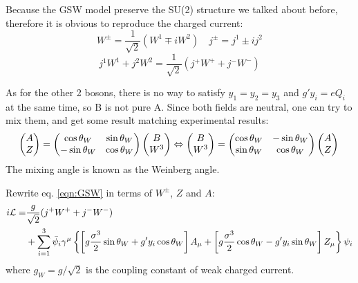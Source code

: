 Because the GSW model preserve the SU(2) structure we talked about before, 
therefore it is obvious to reproduce the charged current:
\begin{equation}
    W^\pm = \frac{1}{\sqrt{2}}(W^1 \mp iW^2)	\quad
    j^\pm = j^1 \pm ij^2
\end{equation}
\begin{equation}
    j^1W^1 + j^2W^2 = \frac{1}{\sqrt{2}}(j^+W^+ + j^-W^-)
\end{equation}

As for the other 2 bosons, there is no way to satisfy $y_1 = y_2 = y_3$ and 
$g'y_i = eQ_i$ at the same time, so B is not pure A. 
Since both fields are neutral, one can try to mix them, 
and get some result matching experimental results:
\begin{equation}
    \begin{pmatrix}
	A   \\
	Z   \\
    \end{pmatrix}
    =
    \begin{pmatrix}
	\cos\theta_W	& \sin\theta_W	\\
	-\sin\theta_W	& \cos\theta_W	\\
    \end{pmatrix}
    \begin{pmatrix}
	B   \\
	W^3 \\
    \end{pmatrix} 
    \Leftrightarrow
    \begin{pmatrix}
	B   \\
	W^3 \\
    \end{pmatrix}
    =
    \begin{pmatrix}
	\cos\theta_W	& -\sin\theta_W	\\
	\sin\theta_W	& \cos\theta_W	\\
    \end{pmatrix}
    \begin{pmatrix}
	A   \\
	Z	\\
    \end{pmatrix} \\
\end{equation}
The mixing angle is known as the Weinberg angle. 

Rewrite eq. \ref{eqn:GSW} in terms of $W^\pm$, $Z$ and $A$:
\begin{equation}
    \begin{aligned}
	i\mathcal{L} = &\frac{g}{\sqrt{2}}(j^+W^+ + j^-W^-)	\\
	    &+ \sum_{i=1}^3\bar{\psi}_i\gamma^\mu \left\{ 
		\left[g\frac{\sigma^3}{2}\sin\theta_W + g'y_i\cos\theta_W\right] A_\mu
		+ \left[ g\frac{\sigma^3}{2}\cos\theta_W - g'y_i\sin\theta_W \right] Z_\mu 
	    \right\} \psi_i
    \end{aligned}
\end{equation}
where $g_W = g/\sqrt{2}$ is the coupling constant of weak charged current.

